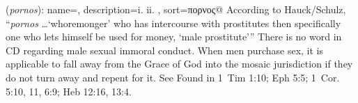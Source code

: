 \item[Male-sex-buyer,]

(\textit{pornos}):
{
    name=,
    description={i.  ii. },
    sort=πορνος@
}
According to Hauck/Schulz, ``\emph{pornos} \ldots `whoremonger' who has intercourse with prostitutes then specifically one who lets himself be used for money, `male prostitute'''
There is no word in CD regarding male sexual immoral conduct. When men purchase sex, it is applicable to fall away from the Grace of God into the mosaic jurisdiction if they do not turn away and repent for it. See 
Found in 1~Tim 1:10; Eph 5:5; 1~Cor. 5:10, 11, 6:9; Heb 12:16, 13:4.
